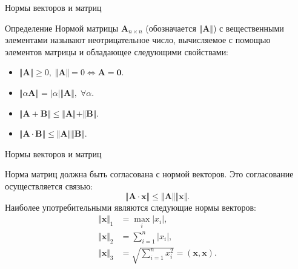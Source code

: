 \documentclass[10pt,xcolor=pst,aspectratio=169]{beamer}
\begin{document}
\begin{frame}{Нормы векторов и матриц}

	\transdissolve[duration=0.2]
	\justifying
	\large
	\begin{block}{Определение}
		\justifying
		Нормой матрицы $\textbf{A}_{n \times n}$ (обозначается $\Vert \textbf{A} \Vert$) с вещественными элементами называют неотрицательное число, вычисляемое с помощью элементов матрицы и обладающее следующими свойствами:
		\begin{itemize}
			\item $\Vert \textbf{A} \Vert \geq 0, \; \Vert \textbf{A} \Vert = 0 \Leftrightarrow \textbf{A} = \textbf{0}$.
			\item $\Vert \alpha \textbf{A} \Vert = \vert \alpha \vert \Vert \textbf{A} \Vert , \; \forall \alpha$.
			\item $\Vert \textbf{A} + \textbf{B} \Vert \leq \Vert \textbf{A} \Vert + \Vert \textbf{B} \Vert$.
			\item $\Vert \textbf{A} \cdot \textbf{B} \Vert \leq \Vert \textbf{A} \Vert \Vert \textbf{B} \Vert$.
		\end{itemize}
	\end{block}

\end{frame}

\begin{frame}{Нормы векторов и матриц}

	\transdissolve[duration=0.2]
	\justifying
	Норма матриц должна быть согласована с нормой векторов. Это согласование осуществляется связью:
	\[
		\Vert \textbf{A} \cdot \textbf{x} \Vert \leq \Vert \textbf{A} \Vert \Vert \textbf{x} \Vert .
	\]
	Наиболее употребительными являются следующие нормы векторов:
	\[
		\begin{split}
			\Vert \textbf{x} \Vert_{1} &= \max_{i} \vert x_{i} \vert , \\
			\Vert \textbf{x} \Vert_{2} &= \sum_{i = 1}^{n} \vert x_{i} \vert , \\
			\Vert \textbf{x} \Vert_{3} &= \sqrt{\sum_{i = 1}^{n} x_{i}^{2}} = (\textbf{x} , \textbf{x}) .
		\end{split}
	\]

\end{frame}
\end{document}
